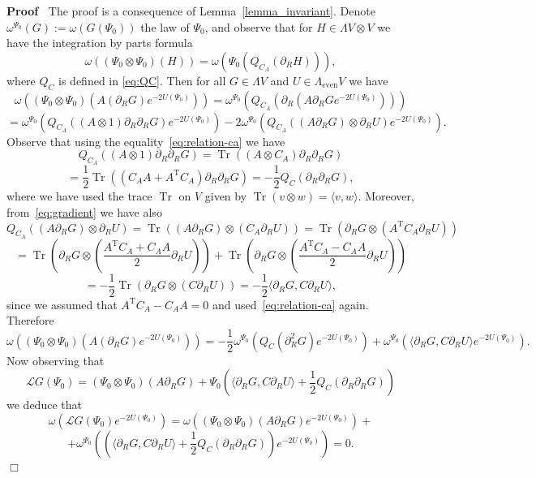 \documentclass{article}
\newcommand{\Tau}{\mathrm{T}}
\newcommand{\assign}{:=}
\newcommand{\tmop}[1]{\ensuremath{\operatorname{#1}}}
\newenvironment{proof}{\noindent\textbf{Proof\ }}{\hspace*{\fill}$\Box$\medskip}
\begin{document}
\begin{proof}
  The proof is a consequence of Lemma~\ref{lemma_invariant}. Denote
  $\omega^{\Psi_0} (G) \assign \omega (G (\Psi_0))$ the law of $\Psi_0$, and
  observe that for $H \in \Lambda V \otimes V$ we have the integration by
  parts formula
  \[ \omega ((\Psi_0 \otimes \Psi_0) (H)) = \omega (\Psi_0 (Q_{C_A}
     (\partial_R H))), \]
  where $Q_C$ is defined in {\eqref{eq:QC}}. Then for all $G \in \Lambda V$
  and $U \in \Lambda_{\tmop{even}} V$ we have
  \[ \omega ((\Psi_0 \otimes \Psi_0) (A (\partial_R G) e^{- 2 U (\Psi_0)})) =
     \omega^{\Psi_0} (Q_{C_A} (\partial_R (A \partial_R G e^{- 2 U
     (\Psi_0)}))) \]
  \[ = \omega^{\Psi_0} (Q_{C_A} ((A \otimes 1) \partial_R \partial_R G) e^{- 2
     U (\Psi_0)}) - 2 \omega^{\Psi_0} (Q_{C_A} ((A \partial_R G) \otimes
     \partial_R U) e^{- 2 U (\Psi_0)}) . \]
  Observe that using the equality~{\eqref{eq:relation-ca}} we have
  \[ Q_{C_A} ((A \otimes 1) \partial_R \partial_R G) = \tmop{Tr} ((A \otimes
     C_A) \partial_R \partial_R G) \]
  \[ = \frac{1}{2} \tmop{Tr} ((C_A A + A^{\Tau} C_A) \partial_R \partial_R G)
     = - \frac{1}{2} Q_C (\partial_R \partial_R G), \]
  where we have used the trace $\tmop{Tr}$ on $V$ given by $\tmop{Tr} (v
  \otimes w) = \langle v, w \rangle$. Moreover, from~{\eqref{eq:gradient}} we
  have also
  \[ Q_{C_A} ((A \partial_R G) \otimes \partial_R U) = \tmop{Tr} ((A
     \partial_R G) \otimes (C_A \partial_R U)) = \tmop{Tr} (\partial_R G
     \otimes (A^{\Tau} C_A \partial_R U)) \]
  \[ = \tmop{Tr} \left( \partial_R G \otimes \left( \frac{A^{\Tau} C_A + C_A
     A}{2} \partial_R U \right) \right) + \tmop{Tr} \left( \partial_R G
     \otimes \left( \frac{A^{\Tau} C_A - C_A A}{2} \partial_R U \right)
     \right) \]
  \[ = - \frac{1}{2} \tmop{Tr} (\partial_R G \otimes (C \partial_R U)) = -
     \frac{1}{2} \langle \partial_R G, C \partial_R U \rangle, \]
  since we assumed that $A^{\Tau} C_A - C_A A = 0$ and
  used~{\eqref{eq:relation-ca}} again. Therefore
  \[ \omega ((\Psi_0 \otimes \Psi_0) (A (\partial_R G) e^{- 2 U (\Psi_0)})) =
     - \frac{1}{2} \omega^{\Psi_0} (Q_C (\partial_R^2 G) e^{- 2 U (\Psi_0)}) +
     \omega^{\Psi_0} (\langle \partial_R G, C \partial_R U \rangle e^{- 2 U
     (\Psi_0)}) . \]
  Now observing that
  \[ \mathcal{L}G (\Psi_0) = (\Psi_0 \otimes \Psi_0) (A \partial_R G) + \Psi_0
     \left( \langle \partial_R G, C \partial_R U \rangle + \frac{1}{2} Q_C
     (\partial_R \partial_R G) \right) \]
  we deduce that
  \[ \omega (\mathcal{L}G (\Psi_0) e^{- 2 U (\Psi_0)}) = \omega ((\Psi_0
     \otimes \Psi_0) (A \partial_R G) e^{- 2 U (\Psi_0)}) + \]
  \[ + \omega^{\Psi_0} \left( \left( \langle \partial_R G, C \partial_R U
     \rangle + \frac{1}{2} Q_C (\partial_R \partial_R G)  \right) e^{- 2 U
     (\Psi_0)} \right) = 0. \]
\end{proof}
\end{document}
